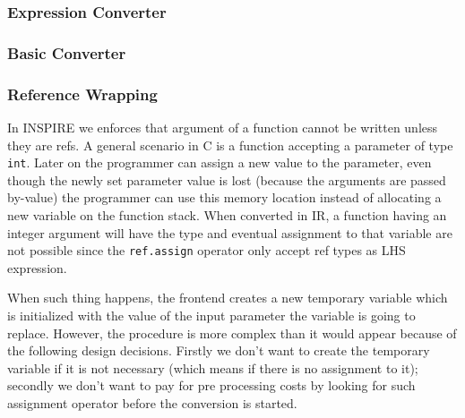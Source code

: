 \subsubsection{Expression Converter}


\subsubsection{Basic Converter}


\subsubsection{Reference Wrapping}

In INSPIRE we enforces that argument of a function cannot be written unless they
are refs. A general scenario in C is a function accepting a parameter of type
{\tt int}. Later on the programmer can assign a new value to the parameter, even
though the newly set parameter value is lost (because the arguments are passed
by-value) the programmer can use this memory location instead of allocating a
new variable on the function stack. When converted in IR, a function having an
integer argument will have the  type and
eventual assignment to that variable are not possible since the {\tt ref.assign}
operator only accept ref types as LHS expression. 

When such thing happens, the frontend creates a new temporary variable which is
initialized with the value of the input parameter the variable is going to
replace. However, the procedure is more complex than it would appear because of
the following design decisions. Firstly we don't want to create the temporary
variable if it  is not necessary (which means if there is no assignment to it);
secondly we don't want to pay for pre processing costs by looking for such
assignment operator before the conversion is started. 

